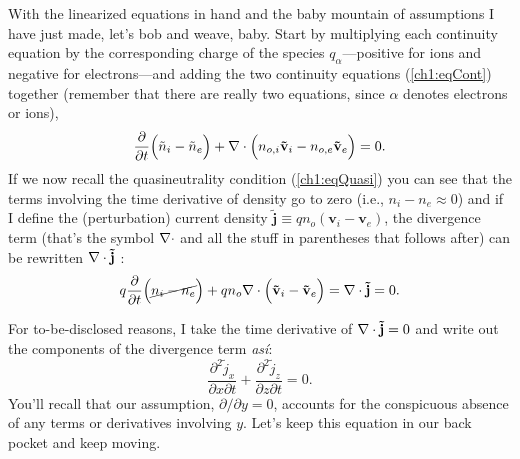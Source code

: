 With the linearized equations in hand and the baby mountain of assumptions I
have just made, let's bob and weave, baby. Start by multiplying each continuity
equation by the corresponding charge of the species $q_\alpha$---positive for
ions and negative for electrons---and adding the two continuity equations
(\ref{ch1:eqCont}) together (remember that there are really two equations, since
$\alpha$ denotes electrons or ions),
\begin{equation} \label{ch1:eqCont1} \dfrac{\partial}{\partial t} \Big (
  \tilde n_i - \tilde n_e \Big ) + {\bf \nabla} \cdot \Big (n_{o,i} \mathbf{\tilde v}_i - n_{o,e}
  \mathbf{\tilde v}_{e} \Big ) = 0.
\end{equation}
If we now recall the quasineutrality condition (\ref{ch1:eqQuasi}) you can see
that the terms involving the time derivative of density go to zero (i.e., $n_i -
n_e \approx 0$) and if I define the (perturbation) current density $\mathbf{\tilde j} \equiv q n_o (
\mathbf{v}_i - \mathbf{v}_e )$, the divergence term (that's the symbol ${\bf \nabla}
\cdot$ and all the stuff in parentheses that follows after) can be rewritten
${\bf \nabla} \cdot \mathbf{\tilde j}$ :
\begin{equation*} 
  q\dfrac{\partial}{\partial t} \Big ( \cancel{n_i - n_e} \Big )
  + q n_o {\bf \nabla} \cdot \Big ( \mathbf{\tilde v}_i - \mathbf{\tilde v}_{e} \Big ) = {\bf \nabla}
  \cdot \mathbf{\tilde j} = 0.
\end{equation*}

For to-be-disclosed reasons, I take the time derivative of ${\bf \nabla} \cdot
\mathbf{\tilde j} = 0$ and write out the components of the divergence term
\emph{as\'{i}}:
\begin{equation} 
  \label{ch1:eqCont2} \dfrac{\partial^2 \tilde j_x}{\partial x \partial t} + \dfrac{\partial^2 \tilde j_z}{\partial z \partial t} = 0.
\end{equation}
You'll recall that our assumption, $\partial / \partial y = 0$, accounts for the
conspicuous absence of any terms or derivatives involving $y$. Let's keep this
equation in our back pocket and keep moving.

